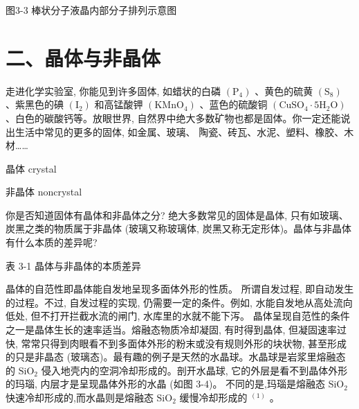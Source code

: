 \documentclass[10pt]{article}
\begin{document}
图3-3 棒状分子液晶内部分子排列示意图

\section*{二、晶体与非晶体}

走进化学实验室, 你能见到许多固体, 如蜡状的白磷 \(\left( {\mathrm{P}}_{4}\right)\) 、黄色的硫黄 \(\left( {\mathrm{S}}_{8}\right)\) 、紫黑色的碘 \(\left( {\mathrm{I}}_{2}\right)\) 和高锰酸钾 \(\left( {\mathrm{{KMnO}}}_{4}\right)\) 、蓝色的硫酸铜 \(\left( {{\mathrm{{CuSO}}}_{4} \cdot 5{\mathrm{H}}_{2}\mathrm{O}}\right)\) 、白色的碳酸钙等。放眼世界, 自然界中绝大多数矿物也都是固体。你一定还能说出生活中常见的更多的固体, 如金属、玻璃、 陶瓷、砖瓦、水泥、塑料、橡胶、木材……

\begin{mdframed}

晶体 crystal

非晶体 noncrystal

\end{mdframed}

你是否知道固体有晶体和非晶体之分? 绝大多数常见的固体是晶体, 只有如玻璃、炭黑之类的物质属于非晶体 (玻璃又称玻璃体, 炭黑又称无定形体)。晶体与非晶体有什么本质的差异呢?

表 3-1 晶体与非晶体的本质差异

\begin{center}
\end{center}

晶体的自范性即晶体能自发地呈现多面体外形的性质。 所谓自发过程, 即自动发生的过程。不过, 自发过程的实现, 仍需要一定的条件。例如, 水能自发地从高处流向低处, 但不打开拦截水流的闸门, 水库里的水就不能下泻。 晶体呈现自范性的条件之一是晶体生长的速率适当。熔融态物质冷却凝固, 有时得到晶体, 但凝固速率过快, 常常只得到肉眼看不到多面体外形的粉末或没有规则外形的块状物, 甚至形成的只是非晶态 (玻璃态)。最有趣的例子是天然的水晶球。水晶球是岩浆里熔融态的 \({\mathrm{{SiO}}}_{2}\) 侵入地壳内的空洞冷却形成的。剖开水晶球, 它的外层是看不到晶体外形的玛瑙, 内层才是呈现晶体外形的水晶 (如图 3-4)。 不同的是,玛瑙是熔融态 \({\mathrm{{SiO}}}_{2}\) 快速冷却形成的,而水晶则是熔融态 \({\mathrm{{SiO}}}_{2}\) 缓慢冷却形成的 \({}^{\left( 1\right) }\) 。
\end{document}
